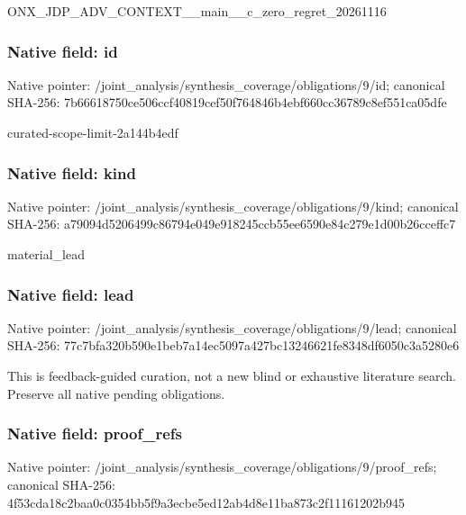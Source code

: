 \documentclass[10pt,a4paper]{article}
\begin{document}
\begingroup\raggedright\sloppy ONX\_\allowbreak{}JDP\_\allowbreak{}ADV\_\allowbreak{}CONTEXT\_\allowbreak{}\_\allowbreak{}main\_\allowbreak{}\_\allowbreak{}c\_\allowbreak{}zero\_\allowbreak{}regret\_\allowbreak{}20261116\par\endgroup

\subsubsection{Native field: id}
Native pointer: /joint\_\allowbreak{}analysis/synthesis\_\allowbreak{}coverage/obligations/9/id; canonical SHA-256: 7b66618750ce506ccf40819cef50f764846b4ebf660cc36789c8ef551ca05dfe

\begingroup\raggedright\sloppy curated-scope-limit-2a144b4edf\par\endgroup

\subsubsection{Native field: kind}
Native pointer: /joint\_\allowbreak{}analysis/synthesis\_\allowbreak{}coverage/obligations/9/kind; canonical SHA-256: a79094d5206499c86794e049e918245ccb55ee6590e84c279e1d00b26cceffc7

\begingroup\raggedright\sloppy material\_\allowbreak{}lead\par\endgroup

\subsubsection{Native field: lead}
Native pointer: /joint\_\allowbreak{}analysis/synthesis\_\allowbreak{}coverage/obligations/9/lead; canonical SHA-256: 77c7bfa320b590e1beb7a14ec5097a427bc13246621fe8348df6050c3a5280e6

\begingroup\raggedright\sloppy This is feedback-guided curation,\allowbreak{} not a new blind or exhaustive literature search. Preserve all native pending obligations.\par\endgroup

\subsubsection{Native field: proof\_\allowbreak{}refs}
Native pointer: /joint\_\allowbreak{}analysis/synthesis\_\allowbreak{}coverage/obligations/9/proof\_\allowbreak{}refs; canonical SHA-256: 4f53cda18c2baa0c0354bb5f9a3ecbe5ed12ab4d8e11ba873c2f11161202b945
\end{document}
